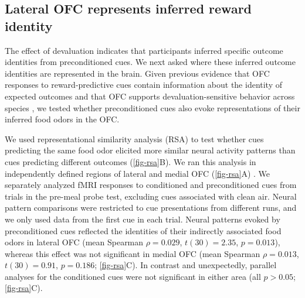 \documentclass[12pt,letterpaper]{article}
\begin{document}
\subsection*{Lateral OFC represents inferred reward identity}


The effect of devaluation indicates that participants inferred specific outcome identities from preconditioned cues. We next asked where these inferred outcome identities are represented in the brain. Given previous evidence that OFC responses to reward-predictive cues contain information about the identity of expected outcomes \citep{howard2015identity,howard2017identity,klein2013segregated,RN650,mcnamee2015associative,RN636,witkowski2026identity} and that OFC supports devaluation-sensitive behavior across species \citep{gal99,RN454,HowRey2020,liu2025distinct}, we tested whether preconditioned cues also evoke representations of their inferred food odors in the OFC.

We used representational similarity analysis (RSA) to test whether cues predicting the same food odor elicited more similar neural activity patterns than cues predicting different outcomes (\autoref{fig-rsa}B). We ran this analysis in independently defined regions of lateral and medial OFC (\autoref{fig-rsa}A) \citep{kahnt2012connectivity}. We separately analyzed fMRI responses to conditioned and preconditioned cues from trials in the pre-meal probe test, excluding cues associated with clean air. Neural pattern comparisons were restricted to cue presentations from different runs, and we only used data from the first cue in each trial. Neural patterns evoked by preconditioned cues reflected the identities of their indirectly associated food odors in lateral OFC (mean Spearman $\rho = 0.029$, $t(30) = 2.35$, $p = 0.013$), whereas this effect was not significant in medial OFC (mean Spearman $\rho = 0.013$, $t(30) = 0.91$, $p = 0.186$; \autoref{fig-rsa}C). In contrast and unexpectedly, parallel analyses for the conditioned cues were not significant in either area (all $p > 0.05$; \autoref{fig-rsa}C).


\par\bigskip\begingroup
{}
\end{document}
